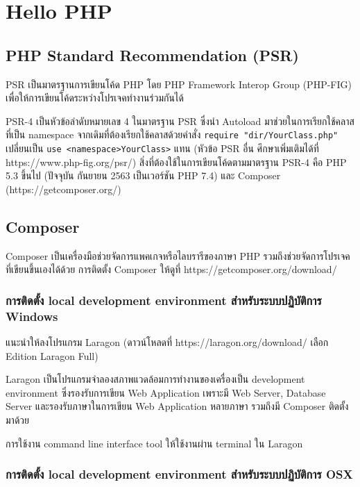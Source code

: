 \chapter{Hello PHP}

\section{PHP Standard Recommendation (PSR)}

PSR เป็นมาตรฐานการเขียนโค้ด PHP โดย PHP Framework Interop Group (PHP-FIG) 
เพื่อให้การเขียนโค้ดระหว่างโปรเจคทำงานร่วมกันได้

PSR-4 เป็นหัวข้อลำดับหมายเลข 4 ในมาตรฐาน PSR ซึ่งนำ Autoload 
มาช่วยในการเรียกใช้คลาสที่เป็น namespace จากเดิมที่ต้องเรียกใช้คลาสด้วยคำสั่ง 
\texttt{require "dir/YourClass.php"} 
เปลี่ยนเป็น \texttt{use <namespace>\<YourClass>} แทน 
(หัวข้อ PSR อื่น ศึกษาเพิ่มเติมได้ที่ https://www.php-fig.org/psr/) 
สิ่งที่ต้องใช้ในการเขียนโค้ดตามมาตรฐาน PSR-4 คือ PHP 5.3 ขึ้นไป 
(ปัจจุบัน กันยายน 2563 เป็นเวอร์ชัน PHP 7.4) และ 
Composer (https://getcomposer.org/)

\section{Composer}

Composer เป็นเครื่องมือช่วยจัดการแพคเกจหรือไลบรารีของภาษา PHP 
รวมถึงช่วยจัดการโปรเจคที่เขียนขึ้นเองได้ด้วย การติดตั้ง Composer 
ให้ดูที่ https://getcomposer.org/download/ 

\subsection{การติดตั้ง local development environment สำหรับระบบปฏิบัติการ Windows}
แนะนำให้ลงโปรแกรม Laragon 
(ดาวน์โหลดที่ https://laragon.org/download/ 
เลือก Edition Laragon Full)

Laragon เป็นโปรแกรมจำลองสภาพแวดล้อมการทำงานของเครื่องเป็น 
development environment ซึ่งรองรับการเขียน Web Application 
เพราะมี Web Server, Database Server และรองรับภาษาในการเขียน 
Web Application หลายภาษา รวมถึงมี Composer ติดตั้งมาด้วย

การใช้งาน command line interface tool ให้ใช้งานผ่าน terminal ใน Laragon

\subsection{การติดตั้ง local development environment สำหรับระบบปฏิบัติการ OSX}

